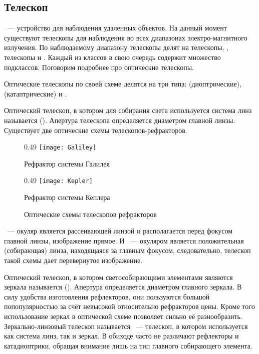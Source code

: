 \subsection{Телескоп}
~--- устройство для наблюдения удаленных объектов. На данный момент существуют телескопы  для наблюдения во всех  диапазонах электро-магнитного излучения. По наблюдаемому диапазону телескопы делят на  телескопы, ,  телескопы и . Каждый из классов в свою очередь содержит множество подклассов. Поговорим подробнее про оптические телескопы.

Оптические телескопы по своей схеме делятся на три типа:  (диоптрические),  (катаптрические) и .

Оптический телескоп, в котором для собирания света используется система линз называется  (). Апертура телескопа определяется диаметром главной линзы. Существует две оптические схемы телескопов-рефракторов. 

\vspace{-.3pc}
\begin{figure}[h!]
    \centering
    \begin{subcaptionblock}{0.49\tw}
        \texttt{[image: Galiley]}
        \caption{Рефрактор системы Галилея}
    \end{subcaptionblock}
    \hfill
    \begin{subcaptionblock}{0.49\tw}
        \texttt{[image: Kepler]}
        \caption{Рефрактор системы Кеплера}
        \label{Kepler}
    \end{subcaptionblock}
    \caption{Оптические схемы телескопов рефракторов}
\end{figure}

~--- окуляр является рассеивающей линзой и располагается перед фокусом главной линзы, изображение прямое. И ~--- окуляром является положительная (собирающая) линза, находящаяся за главным фокусом, следовательно, телескоп такой схемы дает перевернутое изображение.

Оптический телескоп,  в котором светособирающими элементами являются зеркала называется  (). Апертура определяется диаметром главного зеркала. В силу удобства изготовления рефлекторов, они пользуются большой попопулярностью за счёт невысокой относительно рефракторов цены. Кроме того использование зеркал в оптической схеме позволяет сильно её разнообразить. Зеркально-линзовый телескоп называется ~--- телескоп, в котором используется как система линз, так и зеркал. В обиходе часто не различают рефлекторы и катадиоптрики, обращая внимание лишь на тип главного собирающего элемента. 


